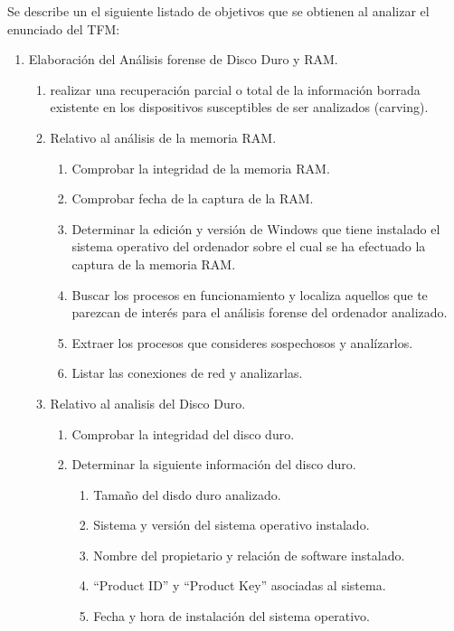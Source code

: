 Se describe un el siguiente listado de objetivos que se obtienen al analizar el enunciado del TFM:

\begin{enumerate}
    \item Elaboración del Análisis forense de Disco Duro y RAM.
    \begin{enumerate}
        \item realizar una recuperación parcial o total de la información borrada existente en los dispositivos susceptibles de ser analizados (carving).
        \item Relativo al análisis de la memoria RAM. 
        \begin{enumerate}
            \item Comprobar la integridad de la memoria RAM.
            \item Comprobar fecha de la captura de la RAM.
            \item Determinar la edición y versión de Windows que tiene instalado el sistema operativo del ordenador sobre el cual se ha efectuado la captura de la memoria RAM.
            \item Buscar los procesos en funcionamiento y localiza aquellos que te parezcan de interés para el análisis forense del ordenador analizado.
            \item Extraer los procesos que consideres sospechosos y analízarlos.
            \item Listar las conexiones de red y analizarlas.
        \end{enumerate}
        \item Relativo al analisis del Disco Duro. 
        \begin{enumerate}
            \item Comprobar la integridad del disco duro.
            \item Determinar la siguiente información del disco duro.
            \begin{enumerate}
                \item Tamaño del disdo duro analizado.
                \item Sistema y versión del sistema operativo instalado.
                \item Nombre del propietario y relación de software instalado.
                \item “Product ID” y “Product Key” asociadas al sistema.
                \item Fecha y hora de instalación del sistema operativo.

\end{enumerate}
\end{enumerate}
\end{enumerate}
\end{enumerate}
